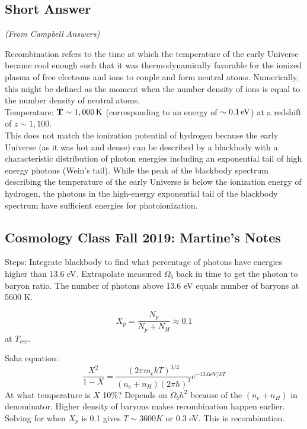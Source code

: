 \documentclass[\main/main.tex]{subfiles}
\begin{document}
	\subsection{Short Answer} %
	\label{sub:short_answer}
	{\it (From Campbell Answers)}

		Recombination refers to the time at which the temperature of the early Universe became cool enough such that it was thermodynamically favorable for the ionized plasma of free electrons and ions to couple and form neutral atoms. Numerically, this might be defined as the moment when the number density of ions is equal to the number density of neutral atoms.\\

		Temperature: ${\mathbf T \sim 1,000\,{\rm K}}$ (corresponding to an energy of $\sim 0.1\,{\rm eV}$) at a redshift of $z \sim 1,100$.\\

		This does not match the ionization potential of hydrogen because the early Universe (as it was hot and dense) can be described by a blackbody with a characteristic distribution of photon energies including an exponential tail of high energy photons (Wein's tail). While the peak of the blackbody spectrum describing the temperature of the early Universe is below the ionization energy of hydrogen, the photons in the high-energy exponential tail of the blackbody spectrum have sufficient energies for photoionization.


	\subsection{Cosmology Class Fall 2019: Martine's Notes} %
	\label{sub:cosmology_class_fall_2019_martine_s_notes}

		Steps: Integrate blackbody to find what percentage of photons have energies higher than 13.6 eV.
	    Extrapolate measured $\Omega_b$ back in time to get the photon to baryon ratio.
	    The number of photons above 13.6 eV equals number of baryons at 5600 K. 
	    
	    \begin{equation}
	        X_p = \frac{N_p}{N_p + N_H} \approx 0.1
	    \end{equation}
	    at $T_{rec}$.
	    
	    Saha equation:
	    \begin{equation}
	        \frac{X^2}{1-X} = \frac{(2\pi m_e kT)^{3/2}}{(n_e + n_H)(2\pi h)^3} e^{-13.6eV/kT}
	    \end{equation}
	    At what temperature is $X$ 10\%?
	    Depends on $\Omega_b h^2$ because of the $(n_e + n_H)$ in denominator. Higher density of baryons makes recombination happen earlier. Solving for when $X_p$ is 0.1 gives $T\sim 3600K$ or 0.3 eV. This is recombination.
	    
\end{document}
